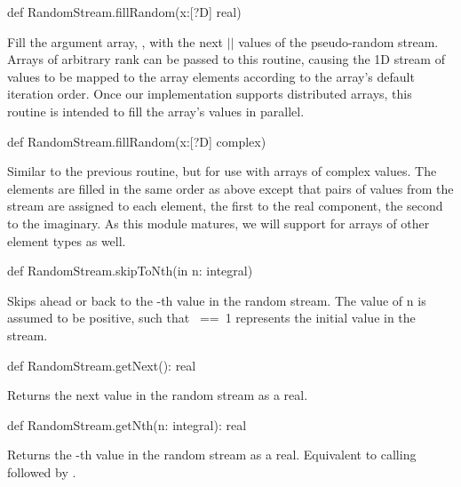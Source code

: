\begin{protohead}
def RandomStream.fillRandom(x:[?D] real)
\end{protohead}
\begin{protobody}
Fill the argument array, , with the next $|$$|$ values
of the pseudo-random stream.  Arrays of arbitrary rank can be passed
to this routine, causing the 1D stream of values to be mapped to the
array elements according to the array's default iteration order.  Once
our implementation supports distributed arrays, this routine is
intended to fill the array's values in parallel.
\end{protobody}

\begin{protohead}
def RandomStream.fillRandom(x:[?D] complex)
\end{protohead}
\begin{protobody}
Similar to the previous routine, but for use with arrays of complex
values.  The elements are filled in the same order as above except
that pairs of values from the stream are assigned to each element, the
first to the real component, the second to the imaginary.  As this
module matures, we will support  for arrays of other
element types as well.
\end{protobody}

\begin{protohead}
def RandomStream.skipToNth(in n: integral)
\end{protohead}
\begin{protobody}
Skips ahead or back to the -th value in the
random stream.  The value of n is assumed to be positive, such that
~==~1 represents the initial value in the stream.
\end{protobody}

\begin{protohead}
def RandomStream.getNext(): real
\end{protohead}
\begin{protobody}
Returns the next value in the random stream as a real.
\end{protobody}

\begin{protohead}
def RandomStream.getNth(n: integral): real
\end{protohead}
\begin{protobody}
Returns the -th value in the random stream as a real.  Equivalent to
calling  followed by .
\end{protobody}

